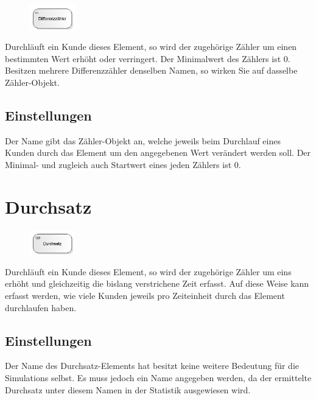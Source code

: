 \begin{figure}
\vspace{-22pt}
\includegraphics[width=2cm]{imageModelElementDifferentialCounter.png}
\vspace{-22pt}
\end{figure}

Durchläuft ein Kunde dieses Element, so wird der zugehörige Zähler um einen bestimmten Wert erhöht oder verringert.
Der Minimalwert des Zählers ist 0. Besitzen mehrere Differenzzähler denselben Namen, so wirken Sie auf dasselbe
Zähler-Objekt.

\subsection*{Einstellungen}

Der Name gibt das Zähler-Objekt an, welche jeweils beim Durchlauf eines Kunden durch das Element um den
angegebenen Wert verändert werden soll. Der Minimal- und zugleich auch Startwert eines jeden Zählers ist 0.


\section{Durchsatz}
\label{ref:ModelElementThroughput}

\begin{figure}
\vspace{-22pt}
\includegraphics[width=2cm]{imageModelElementThroughput.png}
\vspace{-22pt}
\end{figure}

Durchläuft ein Kunde dieses Element, so wird der zugehörige Zähler um eins erhöht und gleichzeitig die
bislang verstrichene Zeit erfasst. Auf diese Weise kann erfasst werden,
wie viele Kunden jeweils pro Zeiteinheit durch das Element durchlaufen haben.

\subsection*{Einstellungen}

Der Name des Durchsatz-Elements hat besitzt keine weitere Bedeutung für die Simulations selbst.
Es muss jedoch ein Name angegeben werden, da der ermittelte Durchsatz unter diesem Namen in der
Statistik ausgewiesen wird.


